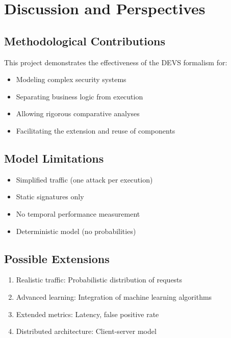 \documentclass{article}
\begin{document}
\section{Discussion and Perspectives}
\subsection{Methodological Contributions}
This project demonstrates the effectiveness of the DEVS formalism for:
\begin{itemize}
    \item Modeling complex security systems
    \item Separating business logic from execution
    \item Allowing rigorous comparative analyses
    \item Facilitating the extension and reuse of components
\end{itemize}

\subsection{Model Limitations}
\begin{itemize}
    \item Simplified traffic (one attack per execution)
    \item Static signatures only
    \item No temporal performance measurement
    \item Deterministic model (no probabilities)
\end{itemize}

\subsection{Possible Extensions}
\begin{enumerate}
    \item Realistic traffic: Probabilistic distribution of requests
    \item Advanced learning: Integration of machine learning algorithms
    \item Extended metrics: Latency, false positive rate
    \item Distributed architecture: Client-server model
\end{enumerate}
\end{document}

